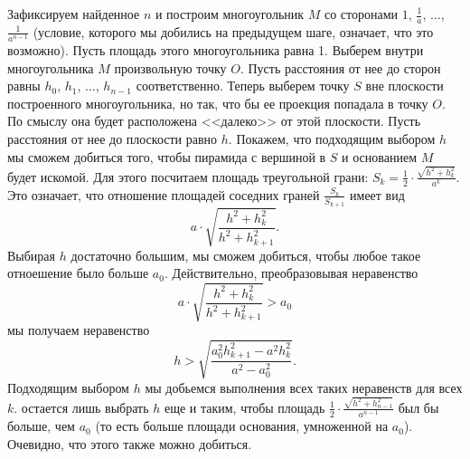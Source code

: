 Зафиксируем найденное $n$ и построим многоугольник $M$ со сторонами $1$, $\frac{1}{a}$, $\ldots$, $\frac{1}{a^{n-1}}$
(условие, которого мы добились на предыдущем шаге, означает, что это возможно).
Пусть площадь этого многоугольника равна 1.
Выберем внутри многоугольника $M$ произвольную точку $O$.
Пусть расстояния от нее до сторон равны $h_0$, $h_1$, $\ldots$, $h_{n-1}$ соответственно.
Теперь выберем точку $S$ вне плоскости построенного многоугольника, но так, что бы ее проекция попадала в точку $O$.
По смыслу она будет расположена <<далеко>> от этой плоскости.
Пусть расстояния от нее до плоскости равно $h$.
Покажем, что подходящим выбором $h$ мы сможем добиться того, чтобы пирамида с вершиной в $S$ и основанием $M$ будет искомой.
Для этого посчитаем площадь треугольной грани:
$S_k=\frac{1}{2} \cdot \frac{\sqrt{h^2+h_k^2}}{a^k}$.
Это означает, что отношение площадей соседних граней $\frac{S_k}{S_{k+1}}$ имеет вид 
\[
    a \cdot \sqrt{\frac{h^2 + h_k^2}{h^2 + h_{k+1}^2}}.
\] 
Выбирая $h$ достаточно большим, мы сможем добиться, чтобы любое такое отноешение было больше $a_0$. Действительно, преобразовывая неравенство
\[
    a \cdot \sqrt{\frac{h^2 + h_k^2}{h^2 + h_{k+1}^2}}
>
    a_0
\]
мы получаем неравенство 
\[
    h
>
    \sqrt{\frac{a_0^2h_{k+1}^2-a^2h_k^2}{a^2-a_0^2}}
.\]
Подходящим выбором $h$ мы добьемся выполнения всех таких
неравенств для всех $k$.
остается лишь выбрать $h$ еще и таким, чтобы
площадь $\frac{1}{2} \cdot \frac{\sqrt{h^2+h_{n-1}^2}}{a^{n-1}}$ был бы больше, чем $a_0$ (то есть больше площади основания, умноженной на $a_0$).
Очевидно,
что этого также можно добиться.
\endproblem

